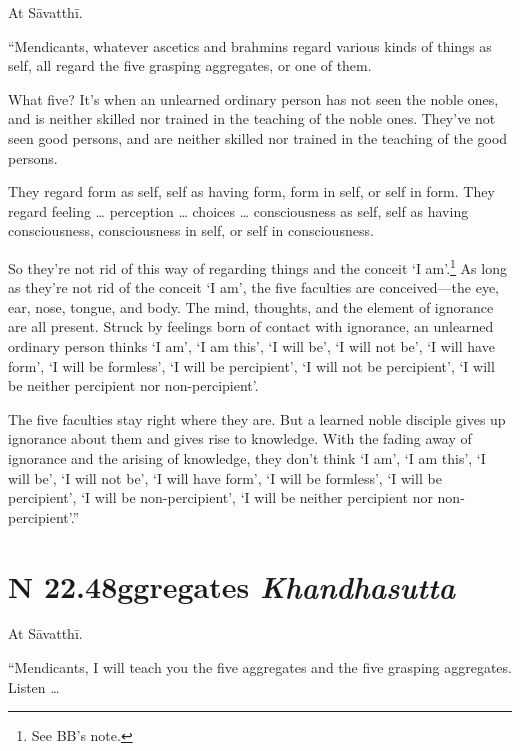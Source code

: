 \documentclass[12pt,openany]{book}%
\newcommand*{\suttatitleacronym}[1]{\smaller[2]{#1}\vspace*{.3em}}
\newcommand*{\suttatitletranslation}[1]{\linebreak{#1}}
\newcommand*{\suttatitleroot}[1]{\linebreak\smaller[2]\itshape{#1}}
\newcommand*{\tocacronym}[1]{\hspace*{-3.3em}{#1}\quad}
\newcommand*{\toctranslation}[1]{#1}
\newcommand*{\tocroot}[1]{(\textit{#1})}
\begin{document}
At \textsanskrit{Sāvatthī}. 

“Mendicants, whatever ascetics and brahmins regard various kinds of things as self, all regard the five grasping aggregates, or one of them. 

What five? It’s when an unlearned ordinary person has not seen the noble ones, and is neither skilled nor trained in the teaching of the noble ones. They’ve not seen good persons, and are neither skilled nor trained in the teaching of the good persons. 

They regard form as self, self as having form, form in self, or self in form. They regard feeling … perception … choices … consciousness as self, self as having consciousness, consciousness in self, or self in consciousness. 

So they’re not rid of this way of regarding things and the conceit ‘I am’.\footnote{See BB’s note. } As long as they’re not rid of the conceit ‘I am’, the five faculties are conceived—the eye, ear, nose, tongue, and body. The mind, thoughts, and the element of ignorance are all present. Struck by feelings born of contact with ignorance, an unlearned ordinary person thinks ‘I am’, ‘I am this’, ‘I will be’, ‘I will not be’, ‘I will have form’, ‘I will be formless’, ‘I will be percipient’, ‘I will not be percipient’, ‘I will be neither percipient nor non-percipient’. 

The five faculties stay right where they are. But a learned noble disciple gives up ignorance about them and gives rise to knowledge. With the fading away of ignorance and the arising of knowledge, they don’t think ‘I am’, ‘I am this’, ‘I will be’, ‘I will not be’, ‘I will have form’, ‘I will be formless’, ‘I will be percipient’, ‘I will be non-percipient’, ‘I will be neither percipient nor non-percipient’.” 

%
\section*{{\suttatitleacronym SN 22.48}{\suttatitletranslation Aggregates }{\suttatitleroot Khandhasutta}}
\addcontentsline{toc}{section}{\tocacronym{SN 22.48} \toctranslation{Aggregates } \tocroot{Khandhasutta}}

At \textsanskrit{Sāvatthī}. 

“Mendicants, I will teach you the five aggregates and the five grasping aggregates. Listen … 
\end{document}

